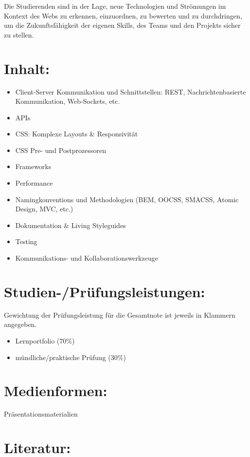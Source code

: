 Die Studierenden sind in der Lage, neue Technologien und Strömungen im
Kontext des Webs zu erkennen, einzuordnen, zu bewerten und zu
durchdringen, um die Zukunftsfähigkeit der eigenen Skills, des Teams und
den Projekts sicher zu stellen.

\section*{Inhalt:}\label{inhalt-23}

\begin{itemize}
\tightlist
\item
  Client-Server Kommunikation und Schnittstellen: REST,
  Nachrichtenbasierte Kommunikation, Web-Sockets, etc.
\item
  APIs
\item
  CSS: Komplexe Layouts \& Responsivität
\item
  CSS Pre- und Postprozessoren
\item
  Frameworks
\item
  Performance
\item
  Namingkonventions und Methodologien (BEM, OOCSS, SMACSS, Atomic
  Design, MVC, etc.)
\item
  Dokumentation \& Living Styleguides
\item
  Testing
\item
  Kommunikations- und Kollaborationswerkzeuge
\end{itemize}

\section*{Studien-/Prüfungsleistungen:}\label{studien-pruxfcfungsleistungen-23}

Gewichtung der Prüfungsleistung für die Gesamtnote ist jeweils in
Klammern angegeben.

\begin{itemize}
\tightlist
\item
  Lernportfolio (70\%)
\item
  mündliche/praktische Prüfung (30\%)
\end{itemize}

\section*{Medienformen:}\label{medienformen-23}

Präsentationsmaterialien

\section*{Literatur:}\label{literatur-23}

